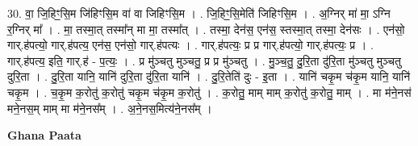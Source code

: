 \documentclass[17pt]{extarticle}
\begin{document}
30. वा॒ जि॒हिꣳ॒॒सि॒म जि॑हिꣳसि॒म वा॑ वा जिहिꣳसि॒म । . जि॒हिꣳ॒॒सि॒मेति॑ जिहिꣳसि॒म । . अ॒ग्निर् मा॑ मा॒ ऽग्नि र॒ग्निर् मा᳚ । . मा॒ तस्मा॒त् तस्मा᳚न् मा मा॒ तस्मा᳚त् । . तस्मा॒ देन॑स॒ एन॑स॒ स्तस्मा॒त् तस्मा॒ देन॑सः । . एन॑सो॒ गार्.ह॑पत्यो॒ गार्.ह॑पत्य॒ एन॑स॒ एन॑सो॒ गार्.ह॑पत्यः । . गार्.ह॑पत्यः॒ प्र प्र गार्.ह॑पत्यो॒ गार्.ह॑पत्यः॒ प्र । . गार्.ह॑पत्य॒ इति॒ गार्.ह॑ - प॒त्यः॒ । . प्र मु॑ञ्चतु मुञ्चतु॒ प्र प्र मु॑ञ्चतु । . मु॒ञ्च॒तु॒ दु॒रि॒ता दु॑रि॒ता मु॑ञ्चतु मुञ्चतु दुरि॒ता । . दु॒रि॒ता यानि॒ यानि॑ दुरि॒ता दु॑रि॒ता यानि॑ । . दु॒रि॒तेति॑ दुः - इ॒ता । . यानि॑ चकृ॒म च॑कृ॒म यानि॒ यानि॑ चकृ॒म । . च॒कृ॒म क॒रोतु॑ क॒रोतु॑ चकृ॒म च॑कृ॒म क॒रोतु॑ । . क॒रोतु॒ माम् माम् क॒रोतु॑ क॒रोतु॒ माम् । . मा म॑ने॒नस॑ मने॒नस॒म् माम् मा म॑ने॒नस᳚म् । . अ॒ने॒नस॒मित्य॑ने॒नस᳚म् । \newline

\textbf{Ghana Paata } \newline
\end{document}
